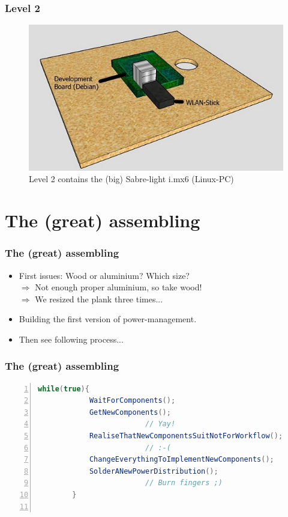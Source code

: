 \documentclass{beamer}
\begin{document}
\begin{frame}
	\frametitle{Level 2}
	\begin{figure}
	\includegraphics[scale=0.7]{figures/level2_b.jpg}
	\caption{Level 2 contains the (big) Sabre-light i.mx6 (Linux-PC)}
	\end{figure}
\end{frame}

\section{The (great) assembling}

\begin{frame}
	\frametitle{The (great) assembling}
	\begin{itemize}
		\item First issues: Wood or aluminium? Which size?\\ \vspace{1em}
		$\Rightarrow$ Not enough proper aluminium, so take wood!\\
		$\Rightarrow$ We resized the plank three times...\\
		\item Building the first version of power-management.
		\item Then see following process...
	\end{itemize}
\end{frame}

\begin{frame}[fragile]
	\frametitle{The (great) assembling}
	\begin{lstlisting}[language=java, numbers=left, xleftmargin=.03\textwidth]
		while(true){
		    WaitForComponents();
		    GetNewComponents(); 
		                 // Yay!
		    RealiseThatNewComponentsSuitNotForWorkflow();
		                 // :-(
		    ChangeEverythingToImplementNewComponents();
		    SolderANewPowerDistribution(); 
		                 // Burn fingers ;)
		}
		
	\end{lstlisting}
\end{frame}
\end{document}
